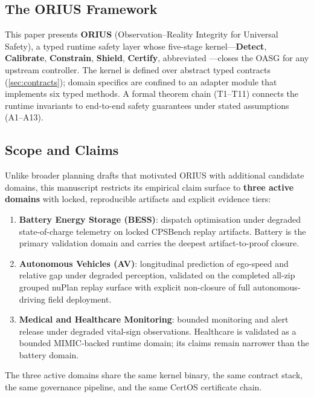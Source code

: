 \subsection{The ORIUS Framework}

This paper presents \textbf{ORIUS} (Observation--Reality Integrity for Universal
Safety), a typed runtime safety layer whose five-stage kernel---\textbf{Detect},
\textbf{Calibrate}, \textbf{Constrain}, \textbf{Shield}, \textbf{Certify}, abbreviated
\dcs{}---closes the OASG for any upstream controller.  The kernel is defined over abstract
typed contracts (\cref{sec:contracts}); domain specifics are confined to an adapter
module that implements six typed methods.  A formal theorem chain (T1--T11) connects
the runtime invariants to end-to-end safety guarantees under stated assumptions
(A1--A13).

\subsection{Scope and Claims}

Unlike broader planning drafts that motivated ORIUS with additional candidate domains,
this manuscript restricts its empirical claim surface to \textbf{three active domains}
with locked, reproducible artifacts and explicit evidence tiers:

\begin{enumerate}[nosep]
        \item \textbf{Battery Energy Storage (BESS)}: dispatch optimisation under degraded
        state-of-charge telemetry on locked CPSBench replay artifacts.  Battery is the
        primary validation domain and carries the deepest artifact-to-proof closure.
  \item \textbf{Autonomous Vehicles (AV)}: longitudinal prediction of ego-speed and
        relative gap under degraded perception, validated on the completed all-zip
        grouped nuPlan replay surface with explicit non-closure of full
        autonomous-driving field deployment.
  \item \textbf{Medical and Healthcare Monitoring}: bounded monitoring and alert release
        under degraded vital-sign observations.  Healthcare is validated as a bounded
        MIMIC-backed runtime domain; its claims remain narrower than the battery domain.
\end{enumerate}

The three active domains share the same kernel binary, the same contract
stack, the same governance pipeline, and the same CertOS certificate chain.

